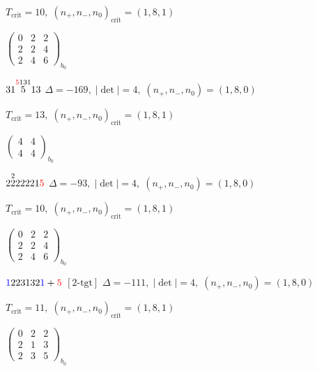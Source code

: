 \documentclass[10pt]{article}
\begin{document}
\hspace{1em}$T_{\text{crit}}=10,\; (n_+,n_-,n_0)_{\text{crit}}=(1,8,1)$

\hspace{2em}$\left(\begin{smallmatrix}0 & 2 & 2 \\ 2 & 2 & 4 \\ 2 & 4 & 6\end{smallmatrix}\right)_{\!b_0}$

\smallskip

$31\overset{\textcolor{red}{5}131}{5}13$ \quad $\Delta=-169,\; |\det|=4,\; (n_+,n_-,n_0)=(1,8,0)$

\hspace{1em}$T_{\text{crit}}=13,\; (n_+,n_-,n_0)_{\text{crit}}=(1,8,1)$

\hspace{2em}$\left(\begin{smallmatrix}4 & 4 \\ 4 & 4\end{smallmatrix}\right)_{\!b_0}$

\smallskip

$2\overset{2}{2}22221\textcolor{red}{5}$ \quad $\Delta=-93,\; |\det|=4,\; (n_+,n_-,n_0)=(1,8,0)$

\hspace{1em}$T_{\text{crit}}=10,\; (n_+,n_-,n_0)_{\text{crit}}=(1,8,1)$

\hspace{2em}$\left(\begin{smallmatrix}0 & 2 & 2 \\ 2 & 2 & 4 \\ 2 & 4 & 6\end{smallmatrix}\right)_{\!b_0}$

\smallskip

$\textcolor{blue}{1}223132\textcolor{blue}{1}+\textcolor{red}{5}$ $\scriptstyle [2\text{-tgt}]$ \quad $\Delta=-111,\; |\det|=4,\; (n_+,n_-,n_0)=(1,8,0)$

\hspace{1em}$T_{\text{crit}}=11,\; (n_+,n_-,n_0)_{\text{crit}}=(1,8,1)$

\hspace{2em}$\left(\begin{smallmatrix}0 & 2 & 2 \\ 2 & 1 & 3 \\ 2 & 3 & 5\end{smallmatrix}\right)_{\!b_0}$
\end{document}
